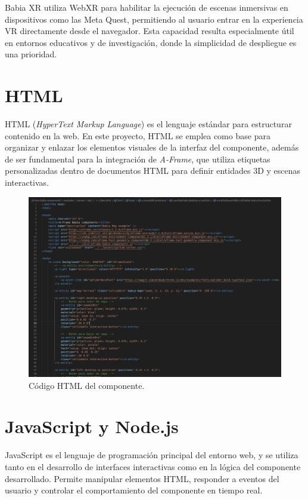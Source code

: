 \documentclass[a4paper, 12pt]{book}
\begin{document}
Babia XR utiliza WebXR para habilitar la ejecución de escenas inmersivas en dispositivos como las Meta Quest, permitiendo al usuario entrar en la experiencia VR directamente desde el navegador. Esta capacidad resulta especialmente útil en entornos educativos y de investigación, donde la simplicidad de despliegue es una prioridad.


\section{HTML}
\label{sec:html}

HTML (\textit{HyperText Markup Language}) es el lenguaje estándar para estructurar contenido en la web. En este proyecto, HTML se emplea como base para organizar y enlazar los elementos visuales de la interfaz del componente, además de ser fundamental para la integración de \textit{A-Frame}, que utiliza etiquetas personalizadas dentro de documentos HTML para definir entidades 3D y escenas interactivas.

\begin{figure}[H]
  \centering
  \includegraphics[width=\textwidth]{img/html.png}
  \caption{Código HTML del componente.}
  \label{fig:html-img}
\end{figure}



\section{JavaScript y Node.js}
\label{sec:js-node}

JavaScript es el lenguaje de programación principal del entorno web, y se utiliza tanto en el desarrollo de interfaces interactivas como en la lógica del componente desarrollado. Permite manipular elementos HTML, responder a eventos del usuario y controlar el comportamiento del componente en tiempo real.
\end{document}

